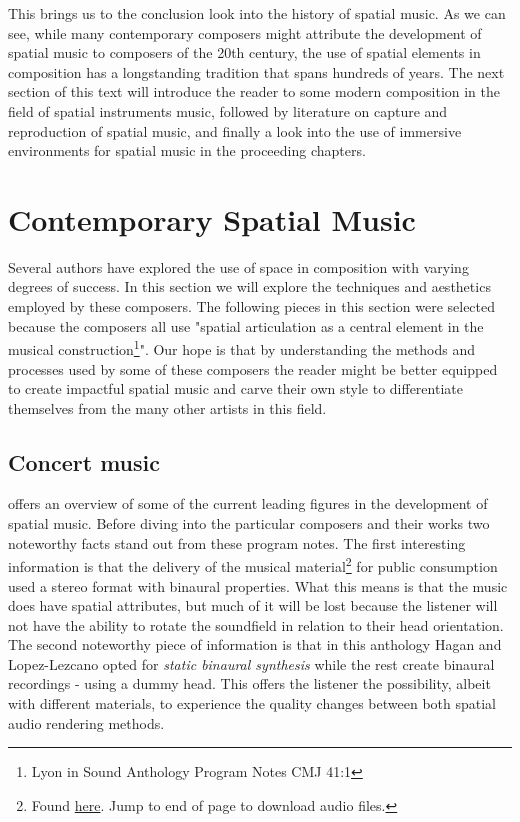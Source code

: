 
This brings us to the conclusion look into the history of spatial music. As we can see, while many contemporary composers might attribute the development of spatial music to composers of the 20th century, the use of spatial elements in composition has a longstanding tradition that spans hundreds of years. The next section of this text will introduce the reader to some modern composition in the field of spatial instruments music, followed by literature on capture and reproduction of spatial music, and finally a look into the use of immersive environments for spatial music in the proceeding chapters.

\section{Contemporary Spatial Music} \label{sec:contemp_works}

Several authors have explored the use of space in composition with varying degrees of success. In this section we will explore the techniques and aesthetics employed by these composers. The following pieces in this section were selected because the composers all use "spatial articulation as a central element in the musical construction\footnote{Lyon in Sound Anthology Program Notes CMJ 41:1}". Our hope is that by understanding the methods and processes used by some of these composers the reader might be better equipped to create impactful spatial music and carve their own style to differentiate themselves from the many other artists in this field. 

\subsection{Concert music}

\cite{hagan2017sound} offers an overview of some of the current leading figures in the development of spatial music. Before diving into the particular composers and their works two noteworthy facts stand out from these program notes. The first interesting information is that the delivery of the musical material\footnote{Found \href{https://muse.jhu.edu/article/656037}{here}. Jump to end of page to download audio files.} for public consumption used a stereo format with binaural properties. What this means is that the music does have spatial attributes, but much of it will be lost because the listener will not have the ability to rotate the soundfield in relation to their head orientation. The second noteworthy piece of information is that in this anthology Hagan and Lopez-Lezcano opted for \textit{static binaural synthesis} while the rest create binaural recordings - using a dummy head. This offers the listener the possibility, albeit with different materials, to experience the quality changes between both spatial audio rendering methods.

